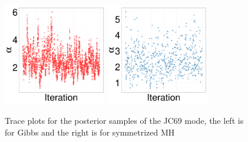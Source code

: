 {  \begin{figure}[H]
  \centering
  \begin{minipage}[!hp]{0.97\linewidth}
    \includegraphics [width=0.40\textwidth, angle=0]{figs/JC_ks/jc_traceGBS_44_05_3_.pdf}
	\hspace{.5in}
    \includegraphics [width=0.40\textwidth, angle=0]{figs/JC_ks/jc_traceMH_44_05_3_.pdf}
  \end{minipage}

    \caption{Trace plots for the posterior samples of the JC69 mode, the left is for Gibbs and the right is for symmetrized MH}
     \label{fig:TRACE_JC}
  \end{figure}

}

